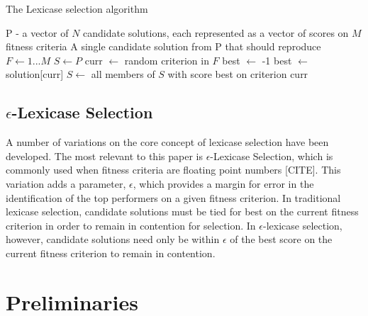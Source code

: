 \documentclass[sigconf]{acmart}
\begin{document}
\begin{algorithm}
\caption{The Lexicase selection algorithm}\label{alg:cap}
\begin{algorithmic}
\Require P - a vector of $N$ candidate solutions, each represented as a vector of scores on $M$ fitness criteria 
\Ensure A single candidate solution from P that should reproduce
\State $F \gets 1...M$ 
\State $S \gets P$ 
\State curr $\gets$ random criterion in $F$
\State best $\gets$ -1 
\State best $\gets$ solution[curr]
\EndIf
\EndFor
\State $S \gets$ all members of $S$ with score best on criterion curr
\EndWhile

\hspace{-2em}
\end{algorithmic}
\end{algorithm}

\subsection{$\epsilon$-Lexicase Selection}

A number of variations on the core concept of lexicase selection have been developed. The most relevant to this paper is $\epsilon$-Lexicase Selection, which is commonly used when fitness criteria are floating point numbers [CITE]. This variation adds a parameter, $\epsilon$, which provides a margin for error in the identification of the top performers on a given fitness criterion. In traditional lexicase selection, candidate solutions must be tied for best on the current fitness criterion in order to remain in contention for selection. In $\epsilon$-lexicase selection, however, candidate solutions need only be within $\epsilon$ of the best score on the current fitness criterion to remain in contention.



\section{Preliminaries}
\end{document}
